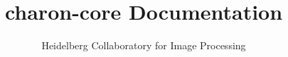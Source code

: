 \documentclass[papersize=a4,headsepline=true]{scrartcl}
\begin{document}
\hypersetup{pageanchor=false}
\title{charon-core Documentation}
\author{Heidelberg Collaboratory for Image Processing}
\maketitle
\pagebreak
{}
\tableofcontents
\pagebreak
{}
\hypersetup{pageanchor=true}
\end{document}
